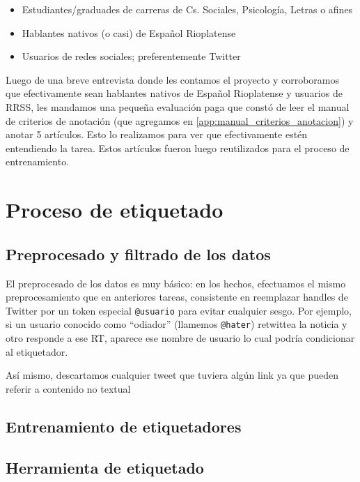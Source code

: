 \begin{itemize}
    \item Estudiantes/graduades de carreras de Cs. Sociales, Psicología, Letras o afines
    \item Hablantes nativos (o casi) de Español Rioplatense
    \item Usuarios de redes sociales; preferentemente Twitter
\end{itemize}

Luego de una breve entrevista donde les contamos el proyecto y corroboramos que efectivamente sean hablantes nativos de Español Rioplatense y usuarios de RRSS, les mandamos una pequeña evaluación paga que constó de leer el manual de criterios de anotación (que agregamos en \ref{app:manual_criterios_anotacion}) y anotar 5 artículos. Esto lo realizamos para ver que efectivamente estén entendiendo la tarea. Estos artículos fueron luego reutilizados para el proceso de entrenamiento.

\section{Proceso de etiquetado}

\subsection{Preprocesado y filtrado de los datos}

El preprocesado de los datos es muy básico: en los hechos, efectuamos el mismo preprocesamiento que en anteriores tareas, consistente en reemplazar handles de Twitter por un token especial \verb|@usuario| para evitar cualquier sesgo. Por ejemplo, si un usuario conocido como ``odiador'' (llamemos \verb|@hater|) retwittea la noticia y otro responde a ese RT, aparece ese nombre de usuario lo cual podría condicionar al etiquetador.

Así mismo, descartamos cualquier tweet que tuviera algún link ya que pueden referir a contenido no textual


\subsection{Entrenamiento de etiquetadores}



%
%
\subsection{Herramienta de etiquetado}

